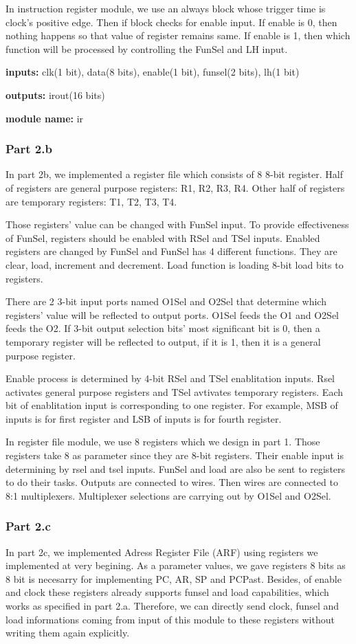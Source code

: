 \documentclass[pdftex,12pt,a4paper]{article}
\begin{document}
In instruction register module, we use an always block whose trigger time is clock's
positive edge. Then if block checks for enable input.
If enable is 0, then nothing happens so that value of register remains same. If
enable is 1, then which function will be processed by controlling the FunSel 
and LH input.

\textbf{inputs:}    clk(1 bit),
data(8 bits),
enable(1 bit),
funsel(2 bits),
lh(1 bit)

\textbf{outputs:}    
irout(16 bits)

\textbf{module name:} ir

\subsubsection{Part 2.b}
In part 2b, we implemented a register file which consists of 8 8-bit register. Half of
registers are general purpose registers: R1, R2, R3, R4. Other half of registers
are temporary registers: T1, T2, T3, T4. 

Those registers' value can be changed 
with FunSel input. To provide effectiveness of FunSel, registers should be enabled
with RSel and TSel inputs. Enabled registers are changed by FunSel and FunSel has
4 different functions. They are clear, load, increment and decrement. Load function
is loading 8-bit load bits to registers.

There are 2 3-bit input ports named O1Sel and O2Sel that determine which registers' 
value will be reflected to output ports. O1Sel feeds the O1 and O2Sel feeds the O2.
If 3-bit output selection bits' most significant bit is 0, then a temporary register
will be reflected to output, if it is 1, then it is a general purpose register.

Enable process is determined by 4-bit RSel and TSel enablitation inputs. Rsel activates
general purpose registers and TSel avtivates temporary registers. Each bit of
enablitation input is corresponding to one register. For example, MSB of inputs is
for first register and LSB of inputs is for fourth register.

In register file module, we use 8 registers which we design in part 1. Those registers
take 8 as parameter since they are 8-bit registers. Their enable input is determining by
rsel and tsel inputs. FunSel and load are also be sent to registers to do their tasks.
Outputs are connected to wires. Then wires are connected to 8:1 multiplexers. Multiplexer
selections are carrying out by O1Sel and O2Sel. 

\subsubsection{Part 2.c}
In part 2c, we implemented Adress Register File (ARF) using registers we implemented at 
very begining. As a parameter values, we gave registers 8 bits as 8 bit is necesarry for 
implementing PC, AR, SP and PCPast. Besides, of enable and clock these registers 
already supports funsel and load capabilities, which works as specified in part 2.a. 
Therefore, we can directly send clock, funsel and load informations coming from 
input of this module to these registers without writing them again explicitly.
\end{document}
